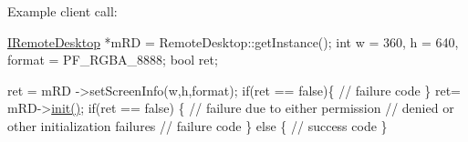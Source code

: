 \-Example client call\-:


\begin{DoxyPre}
  \hyperlink{classandroid_1_1IRemoteDesktop}{IRemoteDesktop} *mRD = RemoteDesktop::getInstance();
	int w = 360, h = 640, format = PF\_RGBA\_8888;
  bool ret;\end{DoxyPre}



\begin{DoxyPre}  ret = mRD ->setScreenInfo(w,h,format);
  if(ret == false)\{
   // failure code
  \}
  ret= mRD->\hyperlink{classandroid_1_1IRemoteDesktop_a5792cf8c7fa9eeb8e21f39927d0fed1e}{init()};
  if(ret == false)  \{ // failure due to either permission 
                      // denied or other initialization failures
     // failure code
  \} else \{
     // success code
  \}
 \end{DoxyPre}


